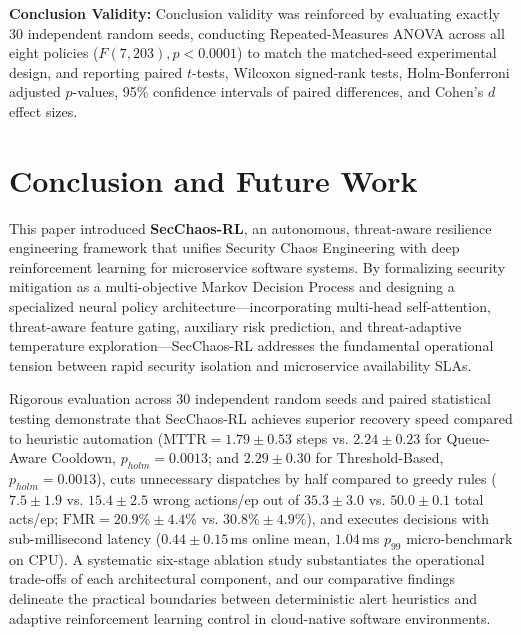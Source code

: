 \documentclass[ASNA,twocolumn]{USG}
\begin{document}
\textbf{Conclusion Validity:} Conclusion validity was reinforced by evaluating exactly 30 independent random seeds, conducting Repeated-Measures ANOVA across all eight policies ($F(7, 203), p < 0.0001$) to match the matched-seed experimental design, and reporting paired $t$-tests, Wilcoxon signed-rank tests, Holm-Bonferroni adjusted $p$-values, 95\% confidence intervals of paired differences, and Cohen's $d$ effect sizes.

\section{Conclusion and Future Work}
\label{sec:conclusion}

This paper introduced \textbf{SecChaos-RL}, an autonomous, threat-aware resilience engineering framework that unifies Security Chaos Engineering with deep reinforcement learning for microservice software systems. By formalizing security mitigation as a multi-objective Markov Decision Process and designing a specialized neural policy architecture—incorporating multi-head self-attention, threat-aware feature gating, auxiliary risk prediction, and threat-adaptive temperature exploration—SecChaos-RL addresses the fundamental operational tension between rapid security isolation and microservice availability SLAs.

Rigorous evaluation across 30 independent random seeds and paired statistical testing demonstrate that SecChaos-RL achieves superior recovery speed compared to heuristic automation ($\text{MTTR} = 1.79 \pm 0.53$ steps vs. $2.24 \pm 0.23$ for Queue-Aware Cooldown, $p_{holm} = 0.0013$; and $2.29 \pm 0.30$ for Threshold-Based, $p_{holm} = 0.0013$), cuts unnecessary dispatches by half compared to greedy rules ($7.5 \pm 1.9$ vs. $15.4 \pm 2.5$ wrong actions/ep out of $35.3 \pm 3.0$ vs. $50.0 \pm 0.1$ total acts/ep; $\text{FMR} = 20.9\% \pm 4.4\%$ vs. $30.8\% \pm 4.9\%$), and executes decisions with sub-millisecond latency ($0.44 \pm 0.15$\,ms online mean, $1.04$\,ms $p_{99}$ micro-benchmark on CPU). A systematic six-stage ablation study substantiates the operational trade-offs of each architectural component, and our comparative findings delineate the practical boundaries between deterministic alert heuristics and adaptive reinforcement learning control in cloud-native software environments.
\end{document}
